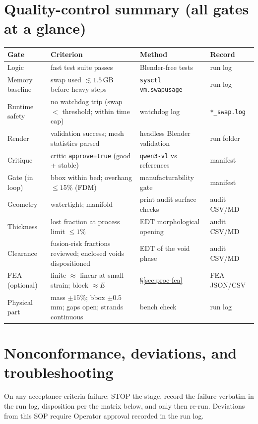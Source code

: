 \documentclass[11pt]{article}
\begin{document}
\section{Quality-control summary (all gates at a glance)}
\begin{longtable}{@{}p{3.1cm}p{4.4cm}p{4.2cm}p{3.0cm}@{}}
\toprule
Gate & Criterion & Method & Record \\
\midrule
Logic & fast test suite passes & Blender-free tests & run log \\
Memory baseline & swap used $\lesssim 1.5$\,GB before heavy steps & \texttt{sysctl vm.swapusage} & run log \\
Runtime safety & no watchdog trip (swap $<$ threshold; within time cap) & watchdog log & \texttt{*\_swap.log} \\
Render & validation success; mesh statistics parsed & headless Blender validation & run folder \\
Critique & critic \texttt{approve=true} (good + stable) & \texttt{qwen3-vl} vs references & manifest \\
Gate (in loop) & bbox within bed; overhang $\le 15\%$ (FDM) & manufacturability gate & manifest \\
Geometry & watertight; manifold & print audit surface checks & audit CSV/MD \\
Thickness & lost fraction at process limit $\le 1\%$ & EDT morphological opening & audit CSV/MD \\
Clearance & fusion-risk fractions reviewed; enclosed voids dispositioned & EDT of the void phase & audit CSV/MD \\
FEA (optional) & finite $\approx$ linear at small strain; block $\approx E$ & \S\ref{sec:proc-fea} & FEA JSON/CSV \\
Physical part & mass $\pm 15\%$; bbox $\pm 0.5$\,mm; gaps open; strands continuous & bench check & run log \\
\bottomrule
\end{longtable}

\section{Nonconformance, deviations, and troubleshooting}\label{sec:nonconf}
On any acceptance-criteria failure: STOP the stage, record the failure verbatim in the run log,
disposition per the matrix below, and only then re-run. Deviations from this SOP require Operator
approval recorded in the run log.
\end{document}
